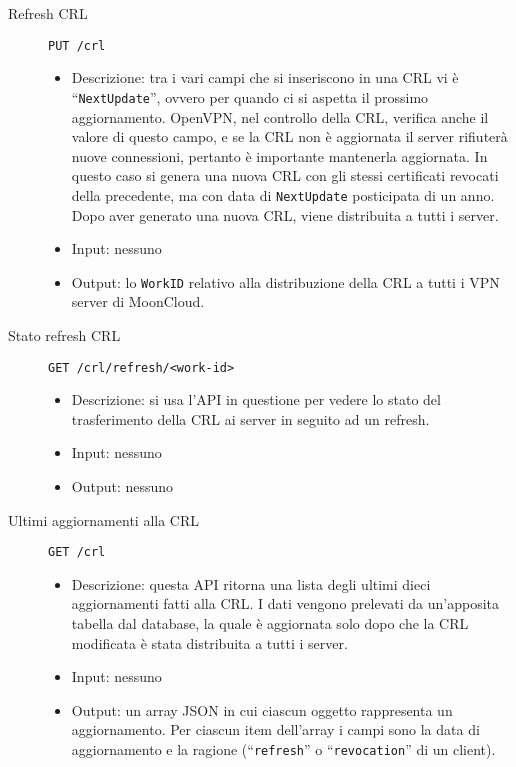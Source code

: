 \begin{description}
    \item[Refresh CRL]\texttt{PUT /crl}
    \begin{itemize}
        \item Descrizione: tra i vari campi che si inseriscono in una CRL vi
        è ``\texttt{NextUpdate}'', ovvero per quando ci si aspetta il prossimo
        aggiornamento. OpenVPN, nel controllo della CRL, verifica anche il valore di
        questo campo, e se la CRL non è aggiornata il server rifiuterà nuove connessioni,
        pertanto è importante mantenerla aggiornata. In questo caso si genera una
        nuova CRL con gli stessi certificati revocati della precedente, ma con data
        di \texttt{NextUpdate} posticipata di un anno. Dopo aver generato una
        nuova CRL, viene distribuita a tutti i server.
        \item Input: nessuno
        \item Output: lo \texttt{WorkID} relativo alla distribuzione della CRL
        a tutti i VPN server di MoonCloud.
    \end{itemize}

    \item[Stato refresh CRL]\texttt{GET /crl/refresh/<work-id>}
    \begin{itemize}
        \item Descrizione: si usa l'API in questione per vedere lo stato
        del trasferimento della CRL ai server in seguito ad un refresh.
        \item Input: nessuno
        \item Output: nessuno
    \end{itemize}

    \item[Ultimi aggiornamenti alla CRL]\texttt{GET /crl}
    \begin{itemize}
        \item Descrizione: questa API ritorna una lista degli ultimi dieci aggiornamenti
        fatti alla CRL. I dati vengono prelevati da un'apposita tabella
        dal database, la quale è aggiornata solo dopo che la CRL modificata è stata distribuita
        a tutti i server.
        \item Input: nessuno 
        \item Output: un array JSON in cui ciascun oggetto rappresenta un aggiornamento.
        Per ciascun item dell'array i campi sono la data di aggiornamento  e la ragione
        (``\texttt{refresh}'' o ``\texttt{revocation}'' di un client). 
    \end{itemize}


\end{description}
